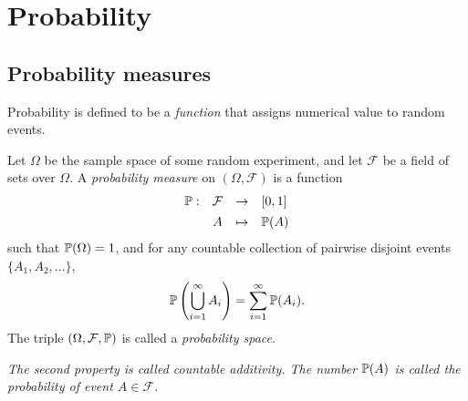 \chapter{Probability}\label{chap:prob}

\section{Probability measures}
Probability is defined to be a \emph{function} that assigns numerical value to random events.

\begin{definition}
Let $\Omega$ be the sample space of some random experiment, and let $\mathcal{F}$ be a field of sets over $\Omega$. A \emph{probability measure} on $(\Omega,\mathcal{F})$ is a function 
\[
\begin{array}{rccl}
	\mathbb{P}:	& \mathcal{F}	& \to	& [0,1] \\[1ex]
			& A				& \mapsto	& \mathbb{P}(A)
\end{array}
\]
such that $\mathbb{P}(\Omega) = 1$, and for any countable collection of pairwise disjoint events $\{A_1,A_2,\ldots\}$,
\[
\mathbb{P}\left(\bigcup_{i=1}^\infty A_i\right) = \sum_{i=1}^{\infty} \mathbb{P}(A_i).
\]
The triple $(\Omega,\mathcal{F},\mathbb{P})$ is called a \emph{probability space}.
\end{definition}

\begin{remark}
\bit
\it The second property is called \emph{countable additivity}.
\it The number $\mathbb{P}(A)$ is called the \emph{probability} of event $A\in\mathcal{F}$.
\eit
\end{remark}

